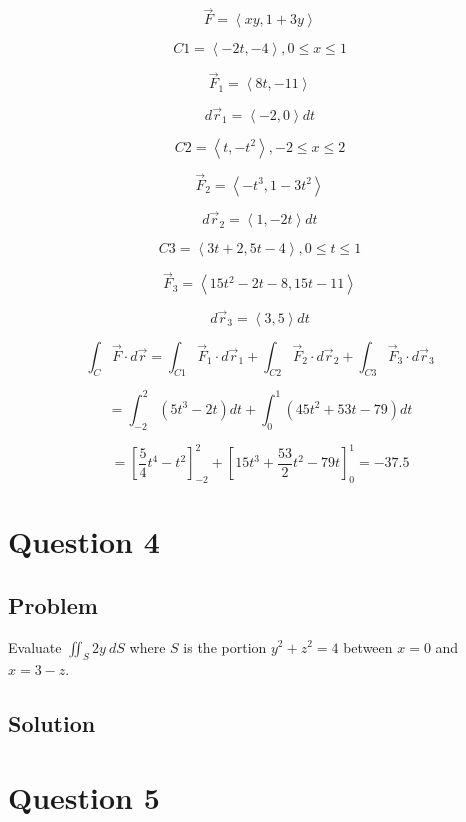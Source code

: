 \documentclass[12pt]{article}
\begin{document}
\[
    \vec{F} = \left\langle xy, 1 + 3y\right\rangle
\]

\[
    C1 = \left\langle -2t, -4\right\rangle, 0 \leq x \leq 1
\]

\[
    \vec{F}_1 = \left\langle 8t, -11 \right\rangle
\]

\[
    d \vec{r}_1 = \left\langle -2, 0\right\rangle d t
\]

\[
    C2 = \left\langle t, -t^2\right\rangle, -2 \leq x \leq 2
\]

\[
    \vec{F}_2 = \left\langle -t^3, 1 - 3t^2\right\rangle
\]

\[
    d \vec{r}_2 = \left\langle 1, -2t\right\rangle d t
\]

\[
    C3 = \left\langle 3t + 2, 5t -4\right\rangle, 0 \leq t \leq 1
\]

\[
    \vec{F}_3 = \left\langle 15t^2 - 2t - 8, 15t - 11\right\rangle
\]

\[
    d \vec{r}_3 = \left\langle 3, 5\right\rangle d t
\]

\[
    \int_C \vec{F} \cdot d \vec{r}
    = \int_{C1} \vec{F}_1 \cdot d \vec{r}_1
    + \int_{C2} \vec{F}_2 \cdot d \vec{r}_2
    + \int_{C3} \vec{F}_3 \cdot d \vec{r}_3
\]

\[
    = \int_{-2}^{2} \left(5t^3 - 2t\right) d t
    + \int_{0}^{1} \left(45t^2 + 53t - 79\right) d t
\]

\[
    = \left[\frac{5}{4} t^4 - t^2\right]_{-2}^{2}
    + {\left[15t^3 + \frac{53}{2} t^2 - 79t\right]}_{0}^{1}
    = -37.5
\]

\newpage
\section{Question 4}

\subsection{Problem}

Evaluate \(\iint_S 2y\ dS\) where \(S\) is the portion \(y^2 + z^2 = 4\) between \(x = 0\)
and \(x = 3 - z\).

\subsection{Solution}



\newpage
\section{Question 5}
\end{document}
